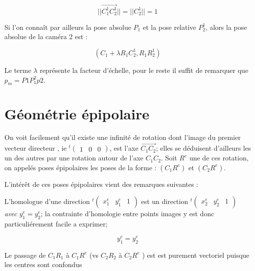 \begin{equation}
   || \overrightarrow{C^1_1 C^1_2} || = || C^1_2 || = 1
 \end{equation}

Si l'on conna\^it par ailleurs la pose absolue $P_1$ et la pose relative
$P^1_2$, alors la pose absolue de la cam\'era 2 est :

\begin{equation}
    (C_1+\lambda R_1C^1_2,R_1R^1_2)
\end{equation}

Le terme $\lambda$ repr\'esente la facteur d'\'echelle, pour le reste il
suffit de remarquer que $p_m = P1 P^2_1 p2$.


\section{G\'eom\'etrie \'epipolaire}

On voit facilement qu'il
existe une infinit\'e de rotation  dont l'image du  premier vecteur
directeur , ie $^t \begin{pmatrix} 1 &  0  &  0 \end{pmatrix}$,
est l'axe $\overrightarrow{C_1 C_2} $; elles se 
d\'eduisent d'ailleurs les un des autres par une rotation autour
de l'axe $C_1 C_2$.   Soit $R^e$ une de ces rotation,
on  appel\'es poses \'epipolaires les poses de la forme :
$(C_1 R^e)$ et $(C_2 R^e)$.

L'int\'er\^et de ces poses \'epipolaires vient des remarques suivantes :


L'homologue d'une direction $^t \begin{pmatrix} x^e_1 &  y^e_1  &  1 \end{pmatrix}$
         est un direction $^t \begin{pmatrix} x^e_2 &  y^e_2  &  1 \end{pmatrix}$ 
	 \emph{avec} $ y^e_1 =  y^e_2$; la contrainte d'homologie entre points
	 images y est donc particuli\'erement facile a exprimer;

\begin{equation}
   y^e_1 =  y^e_2
\end{equation}

Le passage de $C_1 R_1$ \`a $C_1 R^e$ (vs  $C_2 R_2$ \`a $C_2 R^e$ ) est
    est purement vectoriel puisque les centres sont confondus 

